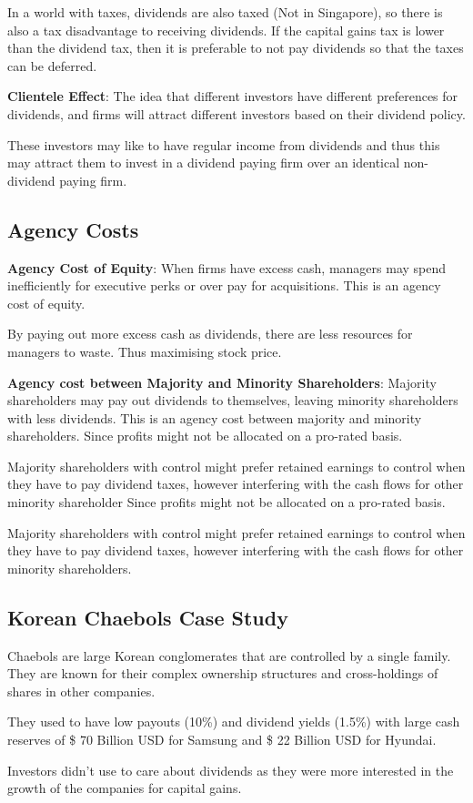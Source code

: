 In a world with taxes, dividends are also taxed (Not in Singapore), so there is also a tax disadvantage to receiving dividends. If the capital gains tax is lower than the dividend tax, then it is preferable to not pay dividends so that the taxes can be deferred.

\textbf{Clientele Effect}:
The idea that different investors have different preferences for dividends, and firms will attract different investors based on their dividend policy.

These investors may like to have regular income from dividends and thus this may attract them to invest in a dividend paying firm over an identical non-dividend paying firm.

\subsection{Agency Costs}
\textbf{Agency Cost of Equity}:
When firms have excess cash, managers may spend inefficiently for executive perks or over pay for acquisitions. This is an agency cost of equity.

By paying out more excess cash as dividends, there are less resources for managers to waste. Thus maximising stock price.

\textbf{Agency cost between Majority and Minority Shareholders}:
Majority shareholders may pay out dividends to themselves, leaving minority shareholders with less dividends. This is an agency cost between majority and minority shareholders. Since profits might not be allocated on a pro-rated basis.

Majority shareholders with control might prefer retained earnings to control when they have to pay dividend taxes, however interfering with the cash flows for other minority shareholder Since profits might not be allocated on a pro-rated basis.

Majority shareholders with control might prefer retained earnings to control when they have to pay dividend taxes, however interfering with the cash flows for other minority shareholders.

\subsection{Korean Chaebols Case Study}
Chaebols are large Korean conglomerates that are controlled by a single family. They are known for their complex ownership structures and cross-holdings of shares in other companies.

They used to have low payouts (10\%) and dividend yields (1.5\%) with large cash reserves of \$ 70 Billion USD for Samsung and \$ 22 Billion USD for Hyundai.

Investors didn't use to care about dividends as they were more interested in the growth of the companies for capital gains.


